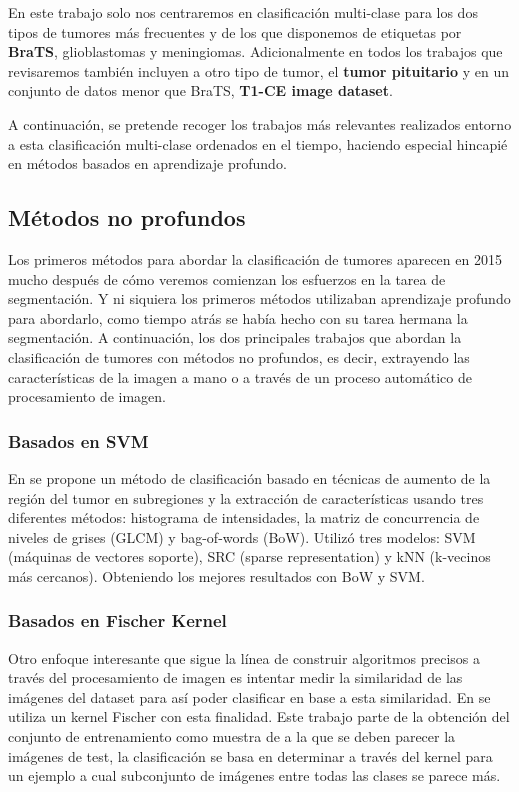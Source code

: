 En este trabajo solo nos centraremos en clasificación multi-clase para los dos tipos de tumores más frecuentes y de los que disponemos de etiquetas por \textbf{BraTS}, glioblastomas y meningiomas. Adicionalmente en todos los trabajos que revisaremos también incluyen a otro tipo de tumor, el \textbf{tumor pituitario} y en un conjunto de datos menor que BraTS, \textbf{T1-CE image dataset}. 

A continuación, se pretende recoger los trabajos más relevantes realizados entorno a esta clasificación multi-clase ordenados en el tiempo, haciendo especial hincapié en métodos basados en aprendizaje profundo. 

\subsection{Métodos no profundos}

Los primeros métodos para abordar la clasificación de tumores aparecen en 2015 mucho después de cómo veremos comienzan los esfuerzos en la tarea de segmentación. Y ni siquiera los primeros métodos utilizaban aprendizaje profundo para abordarlo, como tiempo atrás se había hecho con su tarea hermana la segmentación. A continuación, los dos principales trabajos que abordan la clasificación de tumores con métodos no profundos, es decir, extrayendo las características de la imagen a mano o a través de un proceso automático de procesamiento de imagen.

\subsubsection{Basados en SVM}

En \cite{cheng2015enhanced} se propone un método de clasificación basado en técnicas de aumento de la región del tumor en subregiones y la extracción de características usando tres diferentes métodos: histograma de intensidades, la matriz de concurrencia de niveles de grises (GLCM) y bag-of-words (BoW). Utilizó tres modelos: SVM (máquinas de vectores soporte), SRC (sparse representation) y kNN (k-vecinos más cercanos). Obteniendo los mejores resultados con BoW y SVM.

\subsubsection{Basados en Fischer Kernel}

Otro enfoque interesante que sigue la línea de construir algoritmos precisos a través del procesamiento de imagen es intentar medir la similaridad de las imágenes del dataset para así poder clasificar en base a esta similaridad. En \cite{cheng2016retrieval} se utiliza un kernel Fischer con esta finalidad. Este trabajo parte de la obtención del conjunto de entrenamiento como muestra de a la que se deben parecer la imágenes de test, la clasificación se basa en determinar a través del kernel para un ejemplo a cual subconjunto de imágenes entre todas las clases se parece más. 

